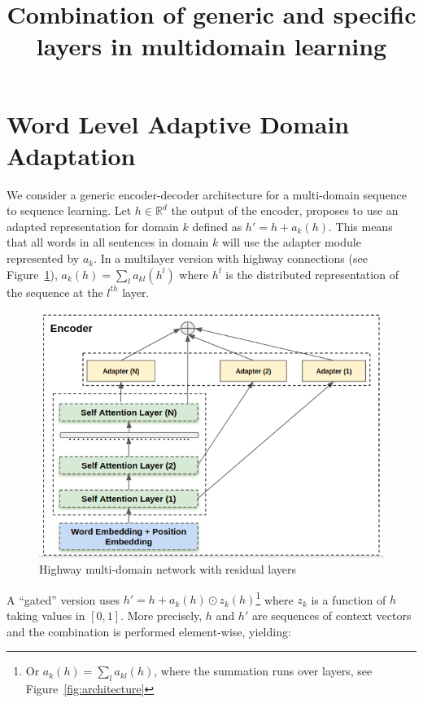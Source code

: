\documentclass[12pt,times,a4paper,twoside]{article}
\title{Combination of generic and specific layers in multidomain learning}
\author{}
\date{}
\newcommand{\fyDone}[1]{\done[FY]\Todo[FY:]{\textcolor{orange}{#1}}}
\theoremstyle{definition}
\newcommand{\R}{\ensuremath{\mathbb{R}}}
\begin{document}
\maketitle
\begin{center}
{\LARGE \bf}\fyDone{Make a proper title}
\end{center}

\section*{Word Level Adaptive Domain Adaptation}
We consider a generic encoder-decoder architecture for a multi-domain sequence to sequence learning. Let $h \in \R^d$ the output of the encoder, \cite{} proposes to use an adapted representation for domain $k$ defined as $h' = h + a_k(h)$. This means that all words in all sentences in domain $k$ will use the adapter module represented by $a_k$. In a multilayer version with highway connections (see Figure~\ref{fig:hrl-architecture}), $a_k(h) = \sum_{l} a_{kl}(h^l)$ where $h^l$ is the distributed representation of the sequence at the $l^{th}$ layer.

\begin{figure}[h!]
  \centering
  \includegraphics[scale=0.5]{fig/highway_residual}
  \caption{Highway multi-domain network with residual layers}
\label{fig:hrl-architecture}
\end{figure}

 A ``gated'' version uses $h' = h + a_k(h) \odot{} z_k(h)$\footnote{Or $a_k(h) = \sum_{l} a_{kl}(h)$, where the summation runs over layers, see Figure~\ref{fig:architecture}} \fyDone{$a_k(h)=$ somme tous les composants résiduels} where $z_k$ is a function of $h$ taking values in $[0,1]$. More precisely, $h$ and $h'$ are sequences of context vectors and the combination is performed element-wise, yielding:\fyDone{pourquoi pas gating: $(1-a_k(h(w))*hh(w)$ ? Notation mult. component wise ?}
\end{document}
